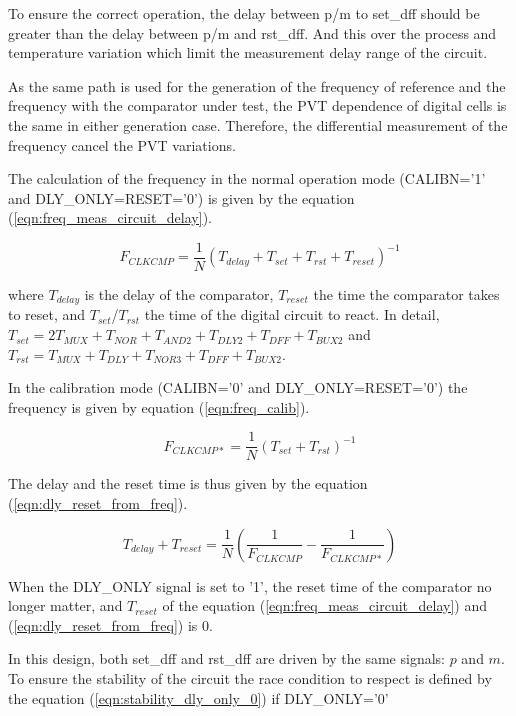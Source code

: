 To ensure the correct operation, the delay between p/m to set\_dff should be greater than the delay between p/m and rst\_dff. And this over the process and temperature variation which limit the measurement delay range of the circuit.

As the same path is used for the generation of the frequency of reference and the frequency with the comparator under test, the PVT dependence of digital cells is the same in either generation case. Therefore, the differential measurement of the frequency cancel the PVT variations.

The calculation of the frequency in the normal operation mode (CALIBN='1' and DLY\_ONLY=RESET='0') is given by the equation (\ref{eqn:freq_meas_circuit_delay}).

\begin{equation} \label{eqn:freq_meas_circuit_delay}
F_{CLKCMP} = \frac{1}{N} {\left(T_{delay}+T_{set}+T_{rst}+T_{reset}\right)}^{-1}
\end{equation}

where $T_{delay}$ is the delay of the comparator, $T_{reset}$ the time the comparator takes to reset, and $T_{set}$/$T_{rst}$ the time of the digital circuit to react. In detail, $T_{set} = 2 T_{MUX} + T_{NOR} + T_{AND2} + T_{DLY2} + T_{DFF} + T_{BUX2}$ and $T_{rst} = T_{MUX} + T_{DLY} + T_{NOR3} + T_{DFF} + T_{BUX2}$.

In the calibration mode (CALIBN='0' and DLY\_ONLY=RESET='0') the frequency is given by equation (\ref{eqn:freq_calib}).

\begin{equation} \label{eqn:freq_calib}
F_{CLKCMP*} = \frac{1}{N} \left(T_{set}+T_{rst}\right)^{-1}
\end{equation}

The delay and the reset time is thus given by the equation (\ref{eqn:dly_reset_from_freq}).

\begin{equation}
\label{eqn:dly_reset_from_freq}
T_{delay}+T_{reset} = \frac{1}{N} \left( \frac{1}{F_{CLKCMP}} - \frac{1}{F_{CLKCMP*}} \right)
\end{equation}

When the DLY\_ONLY signal is set to '1', the reset time of the comparator no longer matter, and $T_{reset}$ of the equation (\ref{eqn:freq_meas_circuit_delay}) and (\ref{eqn:dly_reset_from_freq}) is 0. 

In this design, both set\_dff and rst\_dff are driven by the same signals: $p$ and $m$. To ensure the stability of the circuit the race condition to respect is defined by the equation (\ref{eqn:stability_dly_only_0}) if DLY\_ONLY='0' 

